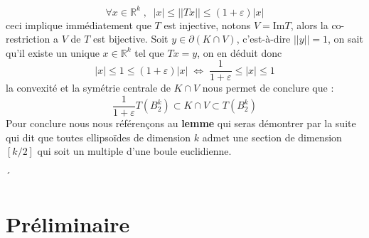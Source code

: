 \documentclass[12pt]{article}
\theoremstyle{definition}
\begin{document}
\begin{enumerate}
	\begin{equation*}
	\forall x \in \mathbb{R}^k \; , \;\; |x|\leq ||Tx||\leq (1+\varepsilon)|x|
	\end{equation*}
	ceci implique immédiatement que $T$ est injective, notons $V=\text{Im}T$, alors la co-restriction a $V$ de $T$ est bijective.
	Soit $y\in \partial(K\cap V)$, c'est-à-dire $||y||=1$, on sait qu'il existe un unique $x\in\mathbb{R}^k$ tel que $Tx=y$, on en déduit donc 
	\begin{equation*}
	|x|\leq 1 \leq (1+\varepsilon)|x|\; \iff\; \frac{1}{1+\varepsilon}\leq|x|\leq 1
	\end{equation*}
	la convexité et la symétrie centrale de $K\cap V$ nous permet de conclure que  :
	\begin{equation*}
		\frac{1}{1+\varepsilon}T(B_2^k)\subset K\cap V \subset T(B_2^k)
	\end{equation*}
	Pour conclure nous nous référençons au \textbf{lemme } qui seras démontrer par la suite qui dit que toutes ellipsoïdes de dimension $k$ admet une section de dimension $[k/2]$ qui soit un multiple d'une boule euclidienne.  

\end{enumerate}


\newtheorem{lemme}[lemme]{Lemme}
\newtheorem{proposition}[proposition]{Proposition}
´


\section{Préliminaire}
\end{document}
